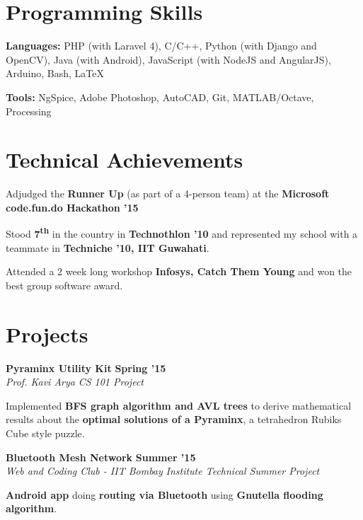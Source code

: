 \documentclass[11pt]{resume}
\begin{document}
\begin{resume}
\begin{list2}
\end{list2}
\section{\mysidestyle Programming Skills}
\begin{list2}
\item \textbf{Languages:} PHP (with Laravel 4), C/C++, Python (with Django and OpenCV), Java (with Android), JavaScript (with NodeJS and AngularJS), Arduino, Bash, \LaTeX
\item \textbf{Tools:} NgSpice, Adobe Photoshop, AutoCAD, Git, MATLAB/Octave, Processing
\end{list2}



\section{\mysidestyle Technical Achievements} 
\begin{list2}
\item Adjudged the \textbf{Runner Up} (as part of a 4-person team) at the \textbf{Microsoft code.fun.do Hackathon '15}

\item Stood \textbf {7\textsuperscript{th}} in the country in \textbf {Technothlon '10} and represented my school with a teammate in \textbf {Techniche '10, IIT Guwahati}. 

\item Attended a 2 week long workshop \textbf{Infosys, Catch Them Young} and won the best group software award. 



\end{list2}




\section{\mysidestyle Projects}
\textbf{Pyraminx Utility Kit} \hfill \textbf{Spring '15}\\
\textsl{Prof. Kavi Arya} \hfill \textsl{CS 101 Project}\\
\vspace{-4mm}
\begin{list2}
\item Implemented \textbf{BFS graph algorithm and AVL trees} to derive mathematical results about the \textbf{optimal solutions of a Pyraminx}, a tetrahedron Rubiks Cube style puzzle.
\end{list2}
\textbf{Bluetooth Mesh Network} \hfill \textbf{Summer '15}\\
\textsl{Web and Coding Club - IIT Bombay} \hfill \textsl{Institute Technical Summer Project}\\
\vspace{-4mm}
\begin{list2}
\item \textbf{Android app} doing \textbf{routing via Bluetooth} using \textbf{Gnutella flooding algorithm}.
\end{list2}


\end{resume}
\end{document}
